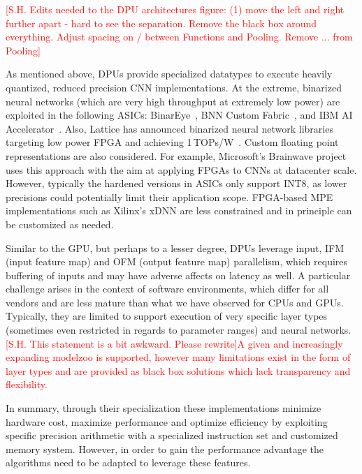 \textcolor{red}{[S.H. Edits needed to the DPU architectures figure: (1) move the left and right further apart - hard to see the separation.  Remove the black box around everything.  Adjust spacing on / between Functions and Pooling.  Remove ... from Pooling]}

As mentioned above, DPUs provide specialized datatypes to execute heavily quantized, reduced precision CNN implementations.
At the extreme, binarized neural networks (which are very high throughput at extremely low power) are exploited in the following ASICs: BinarEye~\cite{binareye}, BNN Custom Fabric~\cite{ando2017brein}, and IBM AI Accelerator~\cite{IBMAI}. Also, Lattice has announced binarized neural network libraries targeting low power FPGA and achieving 1\,TOPs/W~\cite{lattice-bnn}.
Custom floating point representations are also considered. For example, Microsoft's Brainwave project~\cite{chung2018serving} uses this approach with the aim at applying FPGAs to CNNs at datacenter scale.
However, typically the hardened versions in ASICs only support INT8, as lower precisions could potentially limit their application scope. FPGA-based MPE implementations such as Xilinx's xDNN are less constrained and in principle can be customized as needed.

Similar to the GPU, but perhaps to a lesser degree, DPUs leverage input, IFM (input feature map) and OFM (output feature map) parallelism, which requires buffering of inputs and may have adverse affects on latency as well.
A particular challenge arises in the context of software environments, which differ for all vendors and are less mature than what we have observed for CPUs and GPUs. Typically, they are limited to support execution of very specific layer types (sometimes even restricted in regards to parameter ranges) and neural networks. \textcolor{red}{[S.H. This statement is a bit awkward.  Please rewrite]A given and increasingly expanding modelzoo is supported, however many limitations exist in the form of layer types and are provided as black box solutions which lack transparency and flexibility.} 

In summary, through their specialization these implementations minimize hardware cost, maximize performance and optimize efficiency by exploiting specific precision arithmetic with a specialized instruction set and customized memory system. However, in order to gain the performance advantage the algorithms need to be adapted to leverage these features. 

